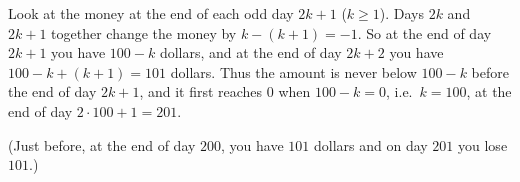 Look at the money at the end of each odd day $2k+1$ ($k\ge1$). Days $2k$ and $2k+1$ together change the money by $k-(k+1)=-1$. So at the end of day $2k+1$ you have $100-k$ dollars, and at the end of day $2k+2$ you have $100-k+(k+1)=101$ dollars. Thus the amount is never below $100-k$ before the end of day $2k+1$, and it first reaches $0$ when $100-k=0$, i.e.\ $k=100$, at the end of day $2\cdot100+1=\boxed{201}$.

(Just before, at the end of day $200$, you have $101$ dollars and on day $201$ you lose $101$.)
